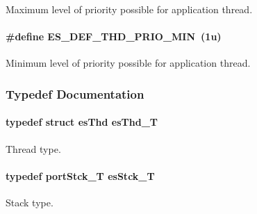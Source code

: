 Maximum level of priority possible for application thread. 

\hypertarget{group__kern__thd_ga4dc54b2d44aa0656de70c7357733f4e4}{
\paragraph[{E\-S\-\_\-\-D\-E\-F\-\_\-\-T\-H\-D\-\_\-\-P\-R\-I\-O\-\_\-\-M\-I\-N}]{\setlength{\rightskip}{0pt plus 5cm}\#define E\-S\-\_\-\-D\-E\-F\-\_\-\-T\-H\-D\-\_\-\-P\-R\-I\-O\-\_\-\-M\-I\-N~(1u)}}\label{group__kern__thd_ga4dc54b2d44aa0656de70c7357733f4e4}


Minimum level of priority possible for application thread. 



\subsubsection{Typedef Documentation}
\hypertarget{group__kern__thd_ga62e3a3ca0a4597a19c43cb8868810d82}{
\paragraph[{es\-Thd\-\_\-\-T}]{\setlength{\rightskip}{0pt plus 5cm}typedef struct {\bf es\-Thd} {\bf es\-Thd\-\_\-\-T}}}\label{group__kern__thd_ga62e3a3ca0a4597a19c43cb8868810d82}


Thread type. 

\hypertarget{group__kern__thd_ga24160ddd0cb0327108cc652bfe6a49e5}{
\paragraph[{es\-Stck\-\_\-\-T}]{\setlength{\rightskip}{0pt plus 5cm}typedef {\bf port\-Stck\-\_\-\-T} {\bf es\-Stck\-\_\-\-T}}}\label{group__kern__thd_ga24160ddd0cb0327108cc652bfe6a49e5}


Stack type. 



